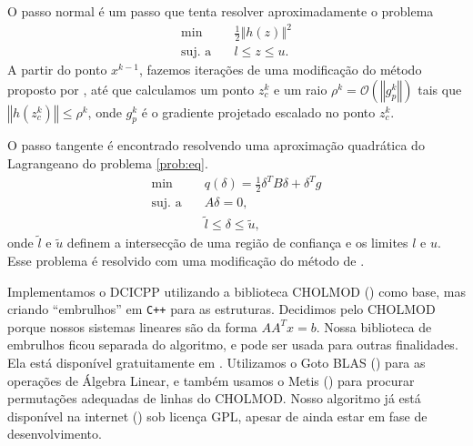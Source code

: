 \documentclass[letterpaper,12pt]{article}
\numberwithin{equation}{section}
\newcommand{\meio}{\frac{1}{2}}
\newcommand{\norma}[1]{\left\Vert{#1}\right\Vert}
\newcommand{\bigo}{\mathcal{O}}
\begin{document}
O passo normal \'{e} um passo que
tenta resolver aproximadamente o problema
\begin{align*}
\min & \quad \meio\norma{h(z)}^2 \\
\mbox{suj. a} & \quad
l \leq z \leq u.
\end{align*}
A partir do ponto $x^{k-1}$, fazemos itera\c{c}\~{o}es de uma
modifica\c{c}\~{a}o
do método proposto por
\citet*{bib:francisco}, at\'{e} que calculamos um ponto $z_c^k$
e um raio $\rho^k = \bigo(\norma{g_p^k})$ tais que $\norma{h(z_c^k)}
\leq \rho^k$, onde $g_p^k$ \'{e} o gradiente projetado escalado no
ponto $z_c^k$. 

O passo tangente é encontrado resolvendo uma aproximação quadrática
do Lagrangeano do problema \eqref{prob:eq}.
\begin{align*}
\min & \quad q(\delta) = \meio\delta^TB\delta + \delta^Tg \\
\mbox{suj. a}& \quad A\delta = 0, \\
& \quad \tilde{l} \leq \delta \leq \tilde{u},
\end{align*}
onde $\tilde{l}$ e $\tilde{u}$ definem a intersec\c{c}\~{a}o 
de uma regi\~{a}o de confian\c{c}a e os limites $l$ e $u$.
Esse problema é resolvido com uma
modificação do método de \citet*{bib:steihaug}.

Implementamos
o DCICPP utilizando a biblioteca CHOLMOD
(\cite{bib:cholmod5,
bib:cholmod2,bib:cholmod3,bib:cholmod1,bib:cholmod4,
bib:colamd1,bib:colamd2,bib:amd1,bib:amd2,bib:timdavis})
como base, mas criando 
``embrulhos'' em \verb=C++= para as estruturas. 
Decidimos pelo CHOLMOD porque nossos sistemas lineares são da forma
$AA^Tx = b$.
Nossa biblioteca
de embrulhos ficou separada do algoritmo, e pode ser usada para outras
finalidades. 
Ela está disponível gratuitamente em \cite{bib:base-matrices}. 
Utilizamos o Goto BLAS (\cite{bib:gotoblas}) para as operações 
de Álgebra Linear, e também usamos o Metis (\cite{bib:metis}) para
procurar permutações adequadas de linhas do CHOLMOD.
Nosso algoritmo já está disponível na internet (\cite{bib:dcicpp})
sob licença 
GPL, apesar de ainda estar em fase de desenvolvimento.
\end{document}
